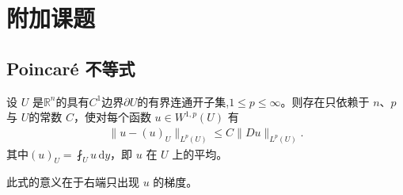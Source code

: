 \documentclass[../../main.tex]{subfiles}
\begin{document}
\section{附加课题}\label{section:ch05-补充主题}

\subsection{Poincaré 不等式}\label{subsection:ch05-边界情形}

\begin{theorem}\label{theorem:ch05-Poincare}
设 $U$ 是$\mathbb{R}^{n}$的具有$C^1$边界$\partial U$的有界连通开子集,$1\leqslant p\leqslant\infty$。则存在只依赖于 $n$、$p$ 与 $U$的常数 $C$，使对每个函数 $u\in W^{1,p}(U)$ 有
\begin{align}
\|u-(u)_{U}\|_{L^{p}(U)}\leqslant C\|Du\|_{L^{p}(U)}.
\end{align}
其中$(u)_{U}=\fint_{U}u\,\mathrm{d}y$，即 $u$ 在 $U$ 上的平均。
\end{theorem}
\begin{remark}
此式的意义在于右端只出现 $u$ 的梯度。
\end{remark}
\end{document}
